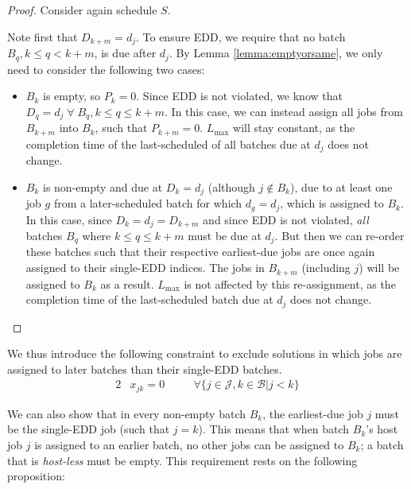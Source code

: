 \documentclass[oribibl]{llncs}
\def\Lmax{{L_{\mathrm{max}}}}
\begin{document}
\begin{proof}
  Consider again schedule $S$.
  
  Note first that $D_{k+m} = d_j$. To ensure EDD, we require that no batch $B_q,
  k\leq q<k+m$, is due after $d_j$. By Lemma \ref{lemma:emptyorsame}, we only
  need to consider the following two cases:

  \begin{itemize}
    \item{$B_k$ is empty, so $P_k = 0$. Since EDD is not violated, we
    know that $D_q = d_j\;\forall\;B_q, k \leq q \leq k+m$. In this case,
    we can instead assign all jobs from $B_{k+m}$ into $B_k$, such that
    $P_{k+m} = 0$. $\Lmax$ will stay constant, as the completion time of
    the last-scheduled of all batches due at $d_j$ does not change.}
    \item{$B_k$ is non-empty and due at $D_k = d_j$ (although $j \notin B_k$), due
        to at least one job $g$ from a later-scheduled batch for which
        $d_g = d_j$, which is assigned to $B_k$. In this case, since $D_k
        = d_j = D_{k+m}$ and since EDD is not violated, \textit{all} batches $B_q$
        where $k \leq q \leq k+m$ must be due at $d_j$. But then we can re-order
        these batches such that their respective earliest-due jobs are once
        again assigned to their single-EDD indices. The jobs in $B_{k+m}$
        (including $j$) will be assigned to $B_k$ as a result. $\Lmax$
    is not affected by this re-assignment, as the completion time of the
    last-scheduled batch due
  at $d_j$ does not change.}
  \end{itemize}
\end{proof}

We thus introduce the following constraint to exclude solutions
in which jobs are assigned to later batches than their single-EDD
batches.
\begin{alignat}{2}
  & x_{jk} = 0 \quad && \forall \{j \in \mathcal{J}, k \in \mathcal{B} | j < k\} \label{eq:mipnopp}
\end{alignat}

We can also show that in every non-empty batch $B_k$,
the earliest-due job $j$ must be the single-EDD job (such that $j =
k$). This means that when batch $B_k$'s host job $j$ is assigned to an
earlier batch, no other jobs can be assigned to $B_k$; a batch
that is \textit{host-less} must be empty. This requirement rests on the
following proposition:
\end{document}
